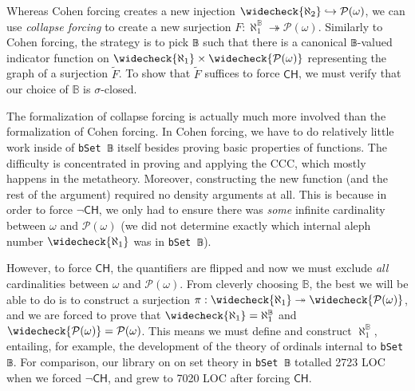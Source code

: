 \documentclass[sigplan,10pt,review, anonymous]{acmart}
\newcommand{\lil}{\lstinline}
\newcommand{\CH}{\mathsf{CH}}
\theoremstyle{definition}
\begin{document}
Whereas Cohen forcing creates a new injection \(\widecheck{\aleph_2} \hookrightarrow \mathcal{P}(\omega)\), we can use \emph{collapse forcing} to create a new surjection \(F : \aleph_1^{\mathbb{B}} \twoheadrightarrow \mathcal{P}(\omega)\).
Similarly to Cohen forcing, the strategy is to pick \lil{𝔹} such that there is a canonical \lil{𝔹}-valued indicator function on \(\widecheck{\aleph_1} \times \widecheck{\mathcal{P}(\omega)}\) representing the graph of a surjection \(\widetilde{F}\).
To show that \(\widetilde{F}\) suffices to force \(\CH\), we must verify that our choice of \(\mathbb{B}\) is \(\sigma\)-closed.
%

The formalization of collapse forcing is actually much more involved than the formalization of Cohen forcing. In Cohen forcing, we have to do relatively little work inside of \lil{bSet 𝔹} itself besides proving basic properties of functions. The difficulty is concentrated in proving and applying the CCC, which mostly happens in the metatheory. Moreover, constructing the new function (and the rest of the argument) required no density arguments at all. This is because in order to force \(\neg \CH\), we only had to ensure there was \emph{some} infinite cardinality between \(\omega\) and \(\mathcal{P}(\omega)\) (we did not determine exactly which internal aleph number \(\widecheck{\aleph_1}\) was in \lil{bSet 𝔹}).

However, to force \(\CH\), the quantifiers are flipped and now we must exclude \emph{all} cardinalities between \(\omega\) and \(\mathcal{P}(\omega)\). From cleverly choosing \(\mathbb{B}\), the best we will be able to do is to construct a surjection \(\pi : \widecheck{\aleph_1} \twoheadrightarrow \widecheck{\mathcal{P}(\omega)}\), and we are forced to prove that \(\widecheck{\aleph_1} = \aleph_1^{\mathbb{B}}\) and \(\widecheck{\mathcal{P}(\omega)} = \mathcal{P}(\omega)\). This means we must define and construct \(\aleph_1^{\mathbb{B}}\), entailing, for example, the development of the theory of ordinals internal to \lstinline{bSet 𝔹}. For comparison, our library on on set theory in \lstinline{bSet 𝔹} totalled 2723 LOC when we forced \(\neg \CH\), and grew to 7020 LOC after forcing \(\CH\).

\end{document}
